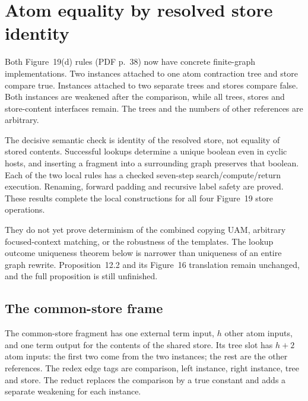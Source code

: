 \clearpage
\section{Atom equality by resolved store identity}
\label{sec:copying-atom-equality}
Both Figure~19(d) rules (PDF p.~38) now have concrete finite-graph
implementations. Two instances attached to one atom contraction tree and
store compare true. Instances attached to two separate trees and stores
compare false. Both instances are weakened after the comparison, while all
trees, stores and store-content interfaces remain. The trees and the
numbers of other references are arbitrary.

The decisive semantic check is identity of the resolved store, not equality
of stored contents. Successful lookups determine a unique boolean even in
cyclic hosts, and inserting a fragment into a surrounding graph preserves
that boolean. Each of the two local rules has a checked seven-step
search/compute/return execution. Renaming, forward padding and recursive
label safety are proved. These results complete the local constructions
for all four Figure~19 store operations.

They do not yet prove determinism of the combined copying UAM, arbitrary
focused-context matching, or the robustness of the templates. The lookup
outcome uniqueness theorem below is narrower than uniqueness of an entire
graph rewrite. Proposition~12.2 and its Figure~16 translation remain
unchanged, and the full proposition is still unfinished.

\subsection{The common-store frame}

The common-store fragment has one external term input, $h$ other atom inputs,
and one term output for the contents of the shared store. Its tree slot has
$h+2$ atom inputs: the first two come from the two instances; the rest are
the other references. The redex edge tags are comparison, left instance,
right instance, tree and store. The reduct replaces the comparison by a
true constant and adds a separate weakening for each instance.



